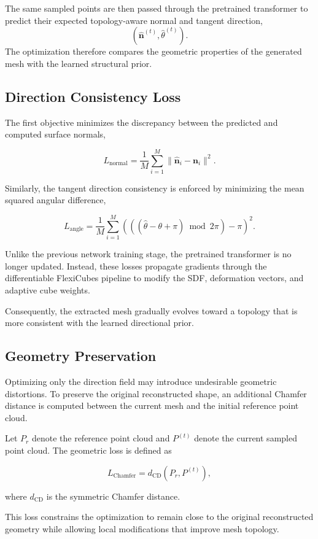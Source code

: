 \documentclass[../main.tex]{subfiles}
\begin{document}
The same sampled points are then passed through the pretrained transformer to predict their expected topology-aware normal and tangent direction,
\[
(\hat{\mathbf n}^{(t)},\hat{\theta}^{(t)}).
\]
The optimization therefore compares the geometric properties of the generated mesh with the learned structural prior.

\subsection{Direction Consistency Loss}

The first objective minimizes the discrepancy between the predicted and computed surface normals,

\[
L_{\mathrm{normal}}
=
\frac{1}{M}
\sum_{i=1}^{M}
\|
\hat{\mathbf n}_i
-
\mathbf n_i
\|^2.
\]

Similarly, the tangent direction consistency is enforced by minimizing the mean squared angular difference,

\[
L_{\mathrm{angle}}
=
\frac{1}{M}
\sum_{i=1}^{M}
(((\hat{\theta}-\theta+\pi)
\bmod
2\pi)-\pi)^2.
\]

Unlike the previous network training stage, the pretrained transformer is no longer updated. Instead, these losses propagate gradients through the differentiable FlexiCubes pipeline to modify the SDF, deformation vectors, and adaptive cube weights.

Consequently, the extracted mesh gradually evolves toward a topology that is more consistent with the learned directional prior.

\subsection{Geometry Preservation}

Optimizing only the direction field may introduce undesirable geometric distortions. To preserve the original reconstructed shape, an additional Chamfer distance is computed between the current mesh and the initial reference point cloud.

Let $P_r$ denote the reference point cloud and $P^{(t)}$ denote the current sampled point cloud. The geometric loss is defined as

\[
L_{\mathrm{Chamfer}}
=
d_{\mathrm{CD}}
(P_r,P^{(t)}),
\]

where $d_{\mathrm{CD}}$ is the symmetric Chamfer distance.

This loss constrains the optimization to remain close to the original reconstructed geometry while allowing local modifications that improve mesh topology.
\end{document}
